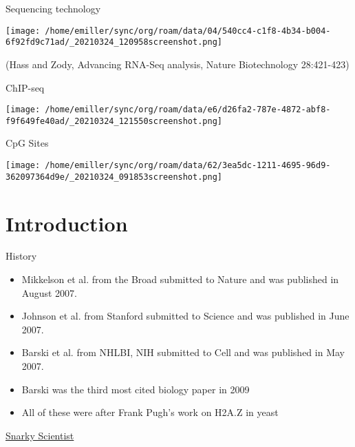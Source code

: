 \documentclass[bigger]{beamer}
\begin{document}
\begin{frame}[label={sec:org7d9fcf5}]{Sequencing technology}
\begin{center}
\texttt{[image: /home/emiller/sync/org/roam/data/04/540cc4-c1f8-4b34-b004-6f92fd9c71ad/\_20210324\_120958screenshot.png]}
\end{center}

(Hass and Zody, Advancing RNA-Seq analysis, Nature Biotechnology 28:421-423)
\end{frame}
\begin{frame}[label={sec:org0fd816b}]{ChIP-seq}
\begin{center}
\texttt{[image: /home/emiller/sync/org/roam/data/e6/d26fa2-787e-4872-abf8-f9f649fe40ad/\_20210324\_121550screenshot.png]}
\end{center}
\end{frame}

\begin{frame}[label={sec:org43e8a90}]{CpG Sites}
\begin{center}
\texttt{[image: /home/emiller/sync/org/roam/data/62/3ea5dc-1211-4695-96d9-362097364d9e/\_20210324\_091853screenshot.png]}
\end{center}
\end{frame}



\section{Introduction}
\label{sec:org2c9dc3f}
\begin{frame}[label={sec:orge8fb555}]{History}
\begin{itemize}
\item Mikkelson et al. from the Broad submitted to Nature and was published in August 2007.
\item Johnson et al. from Stanford submitted to Science and was published in June 2007.
\item Barski et al. from NHLBI, NIH submitted to Cell and was published in May 2007.

\item Barski was the third most cited biology paper in 2009

\item All of these were after Frank Pugh’s work on H2A.Z in yeast
\end{itemize}

\href{http://www.snarkyscientist.com/2013/06/19/the-history-of-the-biggest-technique-of-2009-who-invented-chip-seq/}{Snarky Scientist}
\end{frame}
\end{document}

